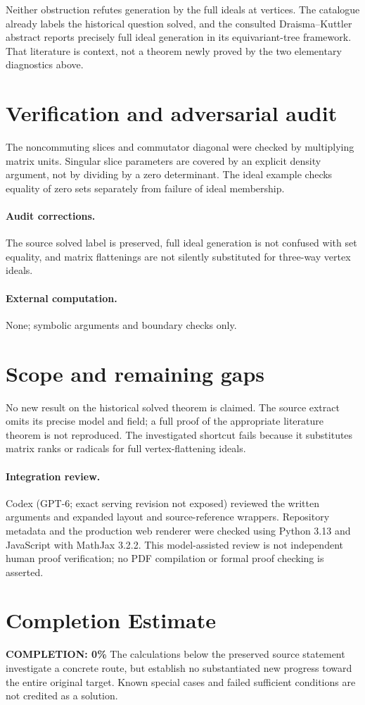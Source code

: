 \documentclass[11pt]{article}
\begin{document}
Neither obstruction refutes generation by the full ideals at vertices. The
catalogue already labels the historical question solved, and the consulted
Draisma--Kuttler abstract reports precisely full ideal generation in its
equivariant-tree framework. That literature is context, not a theorem newly
proved by the two elementary diagnostics above.
\section{Verification and adversarial audit}
The noncommuting slices and commutator diagonal were checked by multiplying
matrix units. Singular slice parameters are covered by an explicit density
argument, not by dividing by a zero determinant. The ideal example checks
equality of zero sets separately from failure of ideal membership.
\paragraph{Audit corrections.} The source solved label is preserved, full ideal generation is not confused with set equality, and matrix flattenings are not silently substituted for three-way vertex ideals.
\paragraph{External computation.} None; symbolic arguments and boundary checks only.
\section{Scope and remaining gaps}
No new result on the historical solved theorem is claimed. The source
extract omits its precise model and field; a full proof of the appropriate
literature theorem is not reproduced. The investigated shortcut fails because
it substitutes matrix ranks or radicals for full vertex-flattening ideals.
\paragraph{Integration review.} Codex (GPT-6; exact serving revision not exposed) reviewed the written arguments and expanded layout and source-reference wrappers. Repository metadata and the production web renderer were checked using Python 3.13 and JavaScript with MathJax 3.2.2. This model-assisted review is not independent human proof verification; no PDF compilation or formal proof checking is asserted.

\section{Completion Estimate}
\noindent\textbf{COMPLETION: 0\%}
The calculations below the preserved source statement investigate a concrete route,
but establish no substantiated new progress toward the entire original target.
Known special cases and failed sufficient conditions are not credited as a solution.
\end{document}
